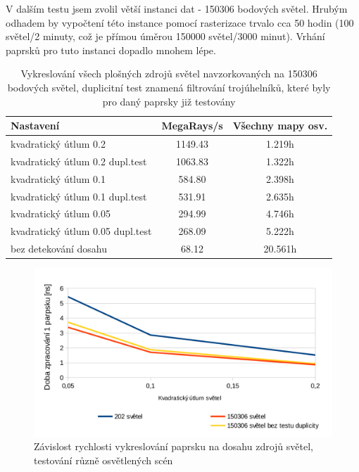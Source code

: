 \documentclass[11pt,twoside,a4paper]{book}
\begin{document}
V dalším testu jsem zvolil větší instanci dat - 150306 bodových světel. Hrubým odhadem by vypočtení této instance pomocí rasterizace trvalo cca 50 hodin (100 světel/2 minuty, což je přímou úměrou 150000 světel/3000 minut). Vrhání paprsků pro tuto instanci dopadlo mnohem lépe.

\begin{table}[h!]
\begin{center}
\begin{tabular}{|p{80mm}|c|c|}
\hline
\textbf{Nastavení} & \textbf{MegaRays/s} & \textbf{Všechny mapy osv.} \\
\hline
kvadratický útlum 0.2 & 1149.43 & 1.219h\\ \hline
kvadratický útlum 0.2 dupl.test & 1063.83 & 1.322h\\ \hline
kvadratický útlum 0.1 & 584.80 & 2.398h\\ \hline
kvadratický útlum 0.1 dupl.test & 531.91 & 2.635h\\ \hline
kvadratický útlum 0.05 & 294.99 & 4.746h\\ \hline
kvadratický útlum 0.05 dupl.test & 268.09 & 5.222h\\ \hline
bez detekování dosahu & 68.12 & 20.561h\\ \hline
\end{tabular}
\caption{Vykreslování všech plošných zdrojů světel navzorkovaných na 150306 bodových světel, duplicitní test znamená filtrování trojúhelníků, které byly pro daný paprsky již testovány }
\end{center}
\end{table}

\begin{figure}[h!]
\includegraphics[width=150mm]{figures/graf3.png}
\caption{Závislost rychlosti vykreslování paprsku na dosahu zdrojů světel, testování různě osvětlených scén}
\end{figure}
\newpage
\end{document}
